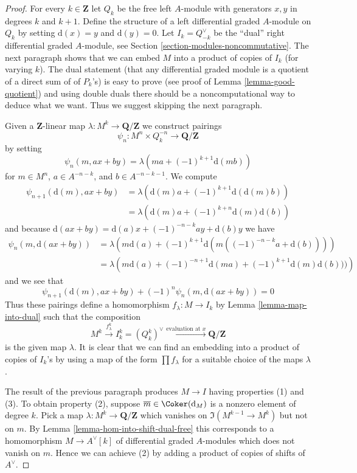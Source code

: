 \begin{proof}
For every $k \in \mathbf{Z}$ let $Q_k$ be the free left $A$-module with
generators $x, y$ in degrees $k$ and $k + 1$. Define the structure of a
left differential graded $A$-module on $Q_k$ by setting $\text{d}(x) = y$
and $\text{d}(y) = 0$. Let $I_k = Q_{-k}^\vee$ be the ``dual'' right
differential graded $A$-module, see
Section \ref{section-modules-noncommutative}.
The next paragraph shows that we can embed $M$ into a product
of copies of $I_k$ (for varying $k$). The dual statement (that any
differential graded module is a quotient of a direct sum of of $P_k$'s)
is easy to prove (see proof of Lemma \ref{lemma-good-quotient})
and using double duals there should be a noncomputational
way to deduce what we want. Thus we suggest skipping the next paragraph.

\medskip\noindent
Given a $\mathbf{Z}$-linear map $\lambda : M^k \to \mathbf{Q}/\mathbf{Z}$
we construct pairings
$$
\psi_n : M^n \times Q_k^{-n} \longrightarrow \mathbf{Q}/\mathbf{Z}
$$
by setting
$$
\psi_n(m, ax + by) = \lambda(ma + (-1)^{k + 1}\text{d}(mb))
$$
for $m \in M^n$, $a \in A^{-n - k}$, and $b \in A^{-n - k - 1}$. We compute
\begin{align*}
\psi_{n + 1}(\text{d}(m), ax + by)
& =
\lambda\left(\text{d}(m)a + (-1)^{k + 1}\text{d}(\text{d}(m)b)\right) \\
& =
\lambda\left(\text{d}(m)a + (-1)^{k + n}\text{d}(m)\text{d}(b)\right)
\end{align*}
and because
$\text{d}(ax + by) = \text{d}(a)x + (-1)^{-n - k}ay + \text{d}(b)y$ we have
\begin{align*}
\psi_n(m, \text{d}(ax + by))
& =
\lambda\left(
m\text{d}(a) + (-1)^{k + 1}\text{d}(m((-1)^{-n - k}a + \text{d}(b)))
\right) \\
& =
\lambda\left(
m\text{d}(a) + (-1)^{-n + 1}\text{d}(ma) + (-1)^{k + 1}\text{d}(m)\text{d}(b)))
\right)
\end{align*}
and we see that
$$
\psi_{n + 1}(\text{d}(m), ax + by) + (-1)^n\psi_n(m, \text{d}(ax + by)) = 0
$$
Thus these pairings define a homomorphism
$f_\lambda : M \to I_k$ by Lemma \ref{lemma-map-into-dual}
such that the composition
$$
M^k \xrightarrow{f^k_\lambda} I_k^k = (Q_k^k)^\vee
\xrightarrow{\text{evaluation at }x} \mathbf{Q}/\mathbf{Z}
$$
is the given map $\lambda$. It is clear that we can find an embedding
into a product of copies of $I_k$'s by using a map of the form
$\prod f_\lambda$ for a suitable choice of the maps $\lambda$.

\medskip\noindent
The result of the previous paragraph produces $M \to I$
having properties (1) and (3). To obtain property (2), suppose
$\overline{m} \in \Coker(\text{d}_M)$ is a nonzero element of
degree $k$. Pick a map $\lambda : M^k \to \mathbf{Q}/\mathbf{Z}$
which vanishes on $\Im(M^{k - 1} \to M^k)$ but not on $m$. By
Lemma \ref{lemma-hom-into-shift-dual-free}
this corresponds to a homomorphism $M \to A^\vee[k]$ of
differential graded $A$-modules which does not vanish on $m$.
Hence we can achieve (2) by adding
a product of copies of shifts of $A^\vee$.
\end{proof}

